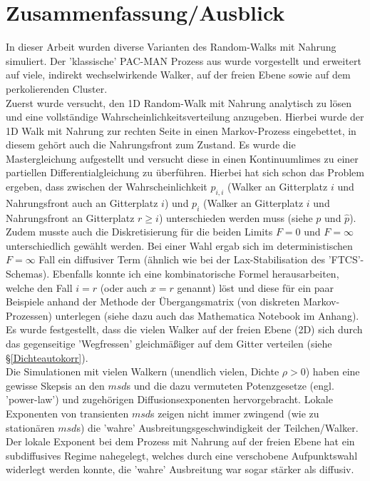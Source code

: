 \documentclass[a4paper, 12pt]{report}
\begin{document}
\chapter{Zusammenfassung/Ausblick}
In dieser Arbeit wurden diverse Varianten des Random-Walks mit Nahrung simuliert. Der 'klassische' PAC-MAN Prozess aus \cite{doi:10.1063/1.4999485} wurde vorgestellt und erweitert auf viele, indirekt wechselwirkende Walker, auf der freien Ebene sowie auf dem perkolierenden Cluster.
\\
Zuerst wurde versucht, den 1D Random-Walk mit Nahrung analytisch zu lösen und eine vollständige Wahrscheinlichkeitsverteilung anzugeben. Hierbei wurde der 1D Walk mit Nahrung zur rechten Seite in einen Markov-Prozess eingebettet, in diesem gehört auch die Nahrungsfront zum Zustand. Es wurde die Mastergleichung aufgestellt und versucht diese in einen Kontinuumlimes zu einer partiellen Differentialgleichung zu überführen. Hierbei hat sich schon das Problem ergeben, dass zwischen der Wahrscheinlichkeit $p_{i,i}$ (Walker an Gitterplatz $i$ und Nahrungsfront auch an Gitterplatz $i$) und $p_i$ (Walker an Gitterplatz $i$ und Nahrungsfront an Gitterplatz $r \geq i$) unterschieden werden muss (siehe $p$ und $\hat{p}$). Zudem musste auch die Diskretisierung für die beiden Limits $F=0$ und $F=\infty$ unterschiedlich gewählt werden. Bei einer Wahl ergab sich im deterministischen $F=\infty$ Fall ein diffusiver Term (ähnlich wie bei der Lax-Stabilisation des 'FTCS'-Schemas). Ebenfalls konnte ich eine kombinatorische Formel herausarbeiten, welche den Fall $i=r$ (oder auch $x=r$ genannt) löst und diese für ein paar Beispiele anhand der Methode der Übergangsmatrix (von diskreten Markov-Prozessen) unterlegen (siehe dazu auch das Mathematica Notebook im Anhang).
\\
Es wurde festgestellt, dass die vielen Walker auf der freien Ebene (2D) sich durch das gegenseitige 'Wegfressen' gleichmäßiger auf dem Gitter verteilen (siehe §\ref{Dichteautokorr}).
\\
Die Simulationen mit vielen Walkern (unendlich vielen, Dichte $\rho > 0$) haben eine gewisse Skepsis an den $msd$s und die dazu vermuteten Potenzgesetze (engl. 'power-law') und zugehörigen Diffusionsexponenten hervorgebracht. Lokale Exponenten von transienten $msd$s zeigen nicht immer zwingend (wie zu stationären $msd$s) die 'wahre' Ausbreitungsgeschwindigkeit der Teilchen/Walker. Der lokale Exponent bei dem Prozess mit Nahrung auf der freien Ebene hat ein subdiffusives Regime nahegelegt, welches durch eine verschobene Aufpunktswahl widerlegt werden konnte, die 'wahre' Ausbreitung war sogar stärker als diffusiv.
\end{document}
